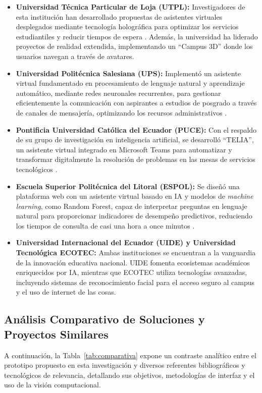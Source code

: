 \begin{itemize}
    \item \textbf{Universidad Técnica Particular de Loja (UTPL):} Investigadores de esta institución han desarrollado propuestas de asistentes virtuales desplegados mediante tecnología holográfica para optimizar los servicios estudiantiles y reducir tiempos de espera \cite{caceres2024asistente}. Además, la universidad ha liderado proyectos de realidad extendida, implementando un ``Campus 3D'' donde los usuarios navegan a través de avatares.
    \item \textbf{Universidad Politécnica Salesiana (UPS):} Implementó un asistente virtual fundamentado en procesamiento de lenguaje natural y aprendizaje automático, mediante redes neuronales recurrentes, para gestionar eficientemente la comunicación con aspirantes a estudios de posgrado a través de canales de mensajería, optimizando los recursos administrativos \cite{guncay2022desarrollo}.
    \item \textbf{Pontificia Universidad Católica del Ecuador (PUCE):} Con el respaldo de su grupo de investigación en inteligencia artificial, se desarrolló ``TELIA'', un asistente virtual integrado en Microsoft Teams para automatizar y transformar digitalmente la resolución de problemas en las mesas de servicios tecnológicos \cite{telia2024}.
    \item \textbf{Escuela Superior Politécnica del Litoral (ESPOL):} Se diseñó una plataforma web con un asistente virtual basado en IA y modelos de \textit{machine learning}, como Random Forest, capaz de interpretar preguntas en lenguaje natural para proporcionar indicadores de desempeño predictivos, reduciendo los tiempos de consulta de casi una hora a once minutos \cite{diaz2025asistente}.
    \item \textbf{Universidad Internacional del Ecuador (UIDE) y Universidad Tecnológica ECOTEC:} Ambas instituciones se encuentran a la vanguardia de la innovación educativa nacional. UIDE fomenta ecosistemas académicos enriquecidos por IA, mientras que ECOTEC utiliza tecnologías avanzadas, incluyendo sistemas de reconocimiento facial para el acceso seguro al campus y el uso de internet de las cosas.
\end{itemize}

\subsection{Análisis Comparativo de Soluciones y Proyectos Similares}
A continuación, la Tabla~\ref{tab:comparativa} expone un contraste analítico entre el prototipo propuesto en esta investigación y diversos referentes bibliográficos y tecnológicos de relevancia, detallando sus objetivos, metodologías de interfaz y el uso de la visión computacional.


